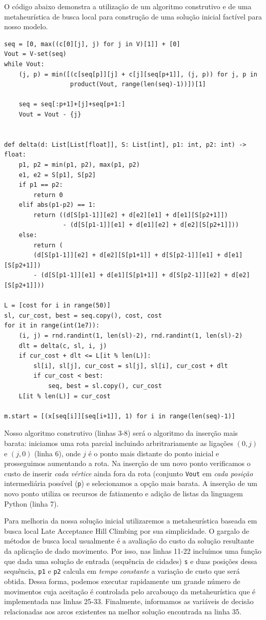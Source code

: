 \documentclass[a4paper,11pt,fleqn]{article}
\begin{document}
O código abaixo demonstra a utilização de um algoritmo construtivo e de uma metaheurística de busca local para construção de uma solução inicial factível para nosso modelo.
 
{\small
\begin{lstlisting}
seq = [0, max((c[0][j], j) for j in V)[1]] + [0]
Vout = V-set(seq)
while Vout:
    (j, p) = min([(c[seq[p]][j] + c[j][seq[p+1]], (j, p)) for j, p in
                  product(Vout, range(len(seq)-1))])[1]

    seq = seq[:p+1]+[j]+seq[p+1:]    
    Vout = Vout - {j}


def delta(d: List[List[float]], S: List[int], p1: int, p2: int) -> float:
    p1, p2 = min(p1, p2), max(p1, p2)
    e1, e2 = S[p1], S[p2]
    if p1 == p2:
        return 0
    elif abs(p1-p2) == 1:
        return ((d[S[p1-1]][e2] + d[e2][e1] + d[e1][S[p2+1]])
                - (d[S[p1-1]][e1] + d[e1][e2] + d[e2][S[p2+1]]))
    else:
        return (
        (d[S[p1-1]][e2] + d[e2][S[p1+1]] + d[S[p2-1]][e1] + d[e1][S[p2+1]])
        - (d[S[p1-1]][e1] + d[e1][S[p1+1]] + d[S[p2-1]][e2] + d[e2][S[p2+1]]))

L = [cost for i in range(50)]
sl, cur_cost, best = seq.copy(), cost, cost
for it in range(int(1e7)):
    (i, j) = rnd.randint(1, len(sl)-2), rnd.randint(1, len(sl)-2)
    dlt = delta(c, sl, i, j)
    if cur_cost + dlt <= L[it % len(L)]:
        sl[i], sl[j], cur_cost = sl[j], sl[i], cur_cost + dlt
        if cur_cost < best:
            seq, best = sl.copy(), cur_cost
    L[it % len(L)] = cur_cost
    
m.start = [(x[seq[i]][seq[i+1]], 1) for i in range(len(seq)-1)]    
\end{lstlisting}}

Nosso algoritmo construtivo (linhas 3-8) será o algoritmo da inserção mais barata: iniciamos uma rota parcial incluindo arbritrariamente as ligações $(0, j)$ e $(j, 0)$ (linha 6), onde $j$ é o ponto mais distante do ponto inicial e prosseguimos aumentando a rota. Na inserção de um novo ponto verificamos o custo de inserir \emph{cada vértice} ainda fora da rota (conjunto \texttt{Vout} em \emph{cada posição} intermediária possível (\texttt{p}) e selecionamos a opção mais barata. A inserção de um novo ponto utiliza os recursos de fatiamento e adição de listas da linguagem Python (linha 7).

Para melhoria da nossa solução inicial utilizaremos a metaheurística baseada em busca local Late Acceptance Hill Climbing \citep{burke2017} por sua simplicidade. O gargalo de métodos de busca local usualmente é a avaliação do custo da solução resultante da aplicação de dado movimento. Por isso, nas linhas 11-22 incluímos uma função que dada uma solução de entrada (sequência de cidades) \texttt{s} e duas posições dessa sequência, \texttt{p1} e \texttt{p2} calcula em \emph{tempo constante} a variação de custo que será obtida. Dessa forma, podemos executar rapidamente um grande número de movimentos cuja aceitação é controlada pelo arcabouço da metaheurística que é implementada nas linhas 25-33. Finalmente, informamos as variáveis de decisão relacionadas aos arcos existentes na melhor solução encontrada na linha 35.
\end{document}
